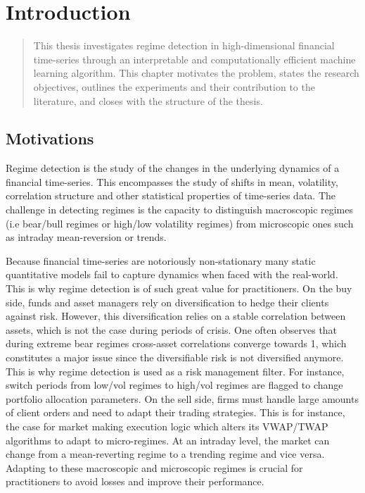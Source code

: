 \documentclass[12pt,a4paper]{report}
\begin{document}
\listoffigures
\newpage
\listoftables
\newpage










\chapter{Introduction}

\begin{quote}
This thesis investigates regime detection in high-dimensional financial
time-series through an interpretable and computationally efficient machine
learning algorithm. This chapter motivates the problem,
states the research objectives, outlines the experiments and their contribution
to the literature, and closes with the structure of the thesis.
\end{quote}


\section{Motivations}
Regime detection is the study of the changes in the underlying dynamics of a financial time-series. 
This encompasses the study of shifts in mean, volatility, correlation structure and other statistical properties of time-series data.
The challenge in detecting regimes is the capacity to distinguish macroscopic regimes (i.e bear/bull regimes or high/low volatility regimes) from microscopic ones such as intraday mean-reversion or trends.

Because financial time-series are notoriously non-stationary many static quantitative models fail to capture dynamics when faced with the real-world. This is why regime detection is of such great value for practitioners. 
On the buy side, funds and asset managers rely on diversification to hedge their clients against risk. However, this diversification relies on a stable correlation between assets, which is not the case during periods of crisis. 
One often observes that during extreme bear regimes cross-asset correlations converge towards 1, which constitutes a major issue since the diversifiable risk is not diversified anymore.
This is why regime detection is used as a risk management filter. For instance, switch periods from low/vol regimes 
to high/vol regimes are flagged to change portfolio allocation parameters. 
On the sell side, firms must handle large amounts of client orders and need to adapt their trading strategies. 
This is for instance, the case for market making execution logic which alters its VWAP/TWAP algorithms to adapt to micro-regimes.
At an intraday level, the market can change from a mean-reverting regime to a trending regime and vice versa. Adapting to these macroscopic and microscopic regimes is crucial for practitioners to avoid losses and improve their performance.
\end{document}
